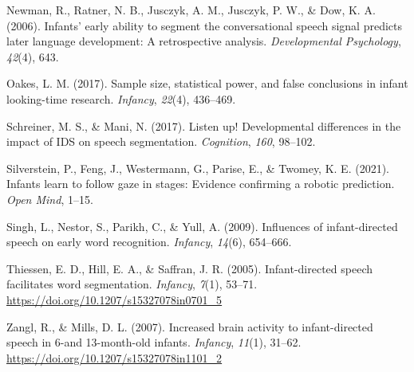 \documentclass[
  man,floatsintext]{apa6}
\newlength{\cslhangindent}
\newlength{\cslentryspacingunit} %
\newenvironment{CSLReferences}[2] %
 {%
  \setlength{\parindent}{0pt}
  \ifodd #1
  \let\oldpar\par
  \def\par{\hangindent=\cslhangindent\oldpar}
  \fi
  \setlength{\parskip}{#2\cslentryspacingunit}
 }%
 {}
\begin{document}
\begin{CSLReferences}{1}{0}
\leavevmode{}%
Newman, R., Ratner, N. B., Jusczyk, A. M., Jusczyk, P. W., \& Dow, K. A. (2006). Infants' early ability to segment the conversational speech signal predicts later language development: A retrospective analysis. \emph{Developmental Psychology}, \emph{42}(4), 643.

\leavevmode{}%
Oakes, L. M. (2017). Sample size, statistical power, and false conclusions in infant looking-time research. \emph{Infancy}, \emph{22}(4), 436--469.

\leavevmode{}%
Schreiner, M. S., \& Mani, N. (2017). Listen up! Developmental differences in the impact of IDS on speech segmentation. \emph{Cognition}, \emph{160}, 98--102.

\leavevmode{}%
Silverstein, P., Feng, J., Westermann, G., Parise, E., \& Twomey, K. E. (2021). Infants learn to follow gaze in stages: Evidence confirming a robotic prediction. \emph{Open Mind}, 1--15.

\leavevmode{}%
Singh, L., Nestor, S., Parikh, C., \& Yull, A. (2009). Influences of infant-directed speech on early word recognition. \emph{Infancy}, \emph{14}(6), 654--666.

\leavevmode{}%
Thiessen, E. D., Hill, E. A., \& Saffran, J. R. (2005). Infant-directed speech facilitates word segmentation. \emph{Infancy}, \emph{7}(1), 53--71. \url{https://doi.org/10.1207/s15327078in0701_5}

\leavevmode{}%
Zangl, R., \& Mills, D. L. (2007). Increased brain activity to infant-directed speech in 6-and 13-month-old infants. \emph{Infancy}, \emph{11}(1), 31--62. \url{https://doi.org/10.1207/s15327078in1101_2}

\end{CSLReferences}

\endgroup
\end{document}
